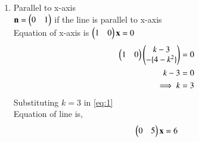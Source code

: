 \documentclass[journal,12pt,twocolumn]{IEEEtran}
\begin{document}
\begin{enumerate}[label=\emph{\alph*)}]
\item Parallel to x-axis\\
$\mathbf{n}=\begin{pmatrix}0 & 1\end{pmatrix}$ if the line is parallel to x-axis\\
Equation of x-axis is $\begin{pmatrix}1 & 0\end{pmatrix}\mathbf{x}=0$\
\begin{equation}
\begin{split}
  \begin{pmatrix}1 & 0\end{pmatrix}\begin{pmatrix}k-3\\-\{4-k^2\}\end{pmatrix} & = 0 \label{eq1}\\
  k-3 & = 0\\
    \implies k & =3
\end{split}
\end{equation}
Substituting $k=3$ in \eqref{eq:1}\\
Equation of line is,
\begin{align}
     \begin{pmatrix}0 & 5\end{pmatrix}\mathbf{x}=6
\end{align}
 

\end{enumerate}
\end{document}

